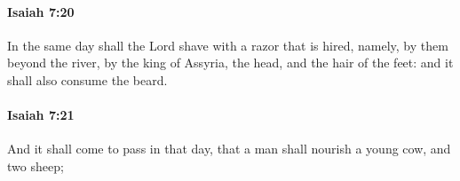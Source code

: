 		\paragraph{Isaiah 7:20} %
			\label{ISAIAH-7-20}

			In the same day shall the Lord shave with a razor that is hired, namely, by them beyond the river, by the king of Assyria, the head, and the hair of the feet: and it shall also consume the beard.


		\paragraph{Isaiah 7:21} %
			\label{ISAIAH-7-21}

			And it shall come to pass in that day, that a man shall nourish a young cow, and two sheep;



